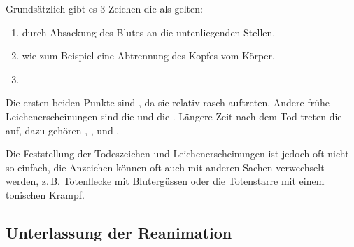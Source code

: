 {%
Grundsätzlich gibt es 3 Zeichen die als  gelten\cite{ForMed2}:

\begin{enumerate}
    \item {} durch
    Absackung des Blutes an die untenliegenden Stellen.
    \item {}
    wie zum Beispiel eine Abtrennung des Kopfes vom Körper.
    \item {}
\end{enumerate}

\noindent Die ersten beiden Punkte sind , da sie
relativ rasch auftreten. Andere frühe Leichenerscheinungen sind die  und die . Längere Zeit nach dem Tod treten die  auf, dazu gehören ,
,  und .

Die Feststellung der Todeszeichen und Leichenerscheinungen
ist jedoch oft nicht so einfach, die Anzeichen können oft
auch mit anderen Sachen verwechselt werden, z.\,B.
Totenflecke mit Blutergüssen oder die Totenstarre mit einem
tonischen Krampf.
}{}{}{}{}






\subsection{Unterlassung der Reanimation}
\label{topic:reanimation-unterlassung}


              

